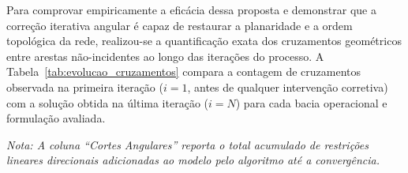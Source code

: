 \documentclass[cic,tc]{infufrgs}
\begin{document}
Para comprovar empiricamente a eficácia dessa proposta e demonstrar que a correção iterativa angular é capaz de restaurar a planaridade e a ordem topológica da rede, realizou-se a quantificação exata dos cruzamentos geométricos entre arestas não-incidentes ao longo das iterações do processo. A Tabela~\ref{tab:evolucao_cruzamentos} compara a contagem de cruzamentos observada na primeira iteração ($i = 1$, antes de qualquer intervenção corretiva) com a solução obtida na última iteração ($i = N$) para cada bacia operacional e formulação avaliada.

\begin{table}[H]
    \centering
    \caption{Comparativo da quantidade de cruzamentos entre a primeira iteração ($i=1$) e a iteração final ($i=N$) do algoritmo de correção iterativa angular.}
    \label{tab:evolucao_cruzamentos}
    \vspace{0.15cm}
    \par\raggedright\footnotesize\textit{Nota: A coluna ``Cortes Angulares'' reporta o total acumulado de restrições lineares direcionais adicionadas ao modelo pelo algoritmo até a convergência.}
\end{table}
\end{document}
